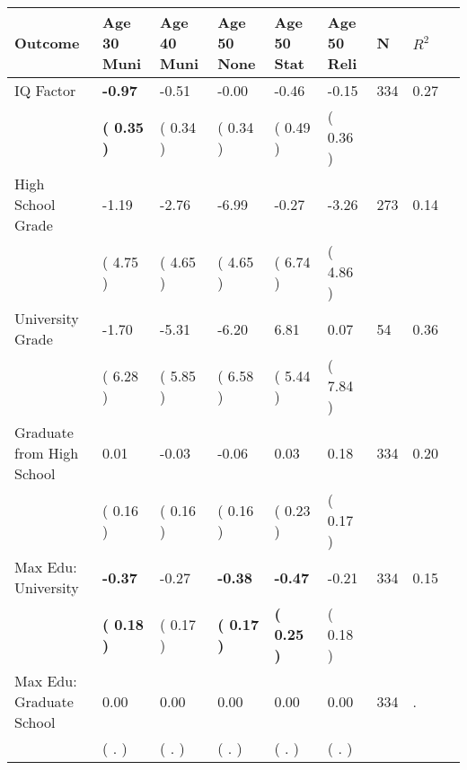 \begin{tabular}{L{6.2cm} C{1.8cm} C{1.8cm} C{1.8cm} C{1.8cm} C{1.8cm} C{1.8cm} C{0.3cm} C{0.3cm}}
\toprule
 \textbf{Outcome} & \textbf{Age 30 Muni} & \textbf{Age 40 Muni} & \textbf{Age 50 None} & \textbf{Age 50 Stat} & \textbf{Age 50 Reli} & \textbf{N} & \textbf{$ R^2$} \\
\midrule
IQ Factor & \textbf{    -0.97} &     -0.51 &     -0.00 &     -0.46 &     -0.15  & 334 &       0.27 \\ 
 & \textbf{(     0.35 )} & (     0.34 ) & (     0.34 ) & (     0.49 ) & (     0.36 )  & \\
High School Grade &     -1.19 &     -2.76 &     -6.99 &     -0.27 &     -3.26  & 273 &       0.14 \\ 
 & (     4.75 ) & (     4.65 ) & (     4.65 ) & (     6.74 ) & (     4.86 )  & \\
University Grade &     -1.70 &     -5.31 &     -6.20 &      6.81 &      0.07  & 54 &       0.36 \\ 
 & (     6.28 ) & (     5.85 ) & (     6.58 ) & (     5.44 ) & (     7.84 )  & \\
Graduate from High School &      0.01 &     -0.03 &     -0.06 &      0.03 &      0.18  & 334 &       0.20 \\ 
 & (     0.16 ) & (     0.16 ) & (     0.16 ) & (     0.23 ) & (     0.17 )  & \\
Max Edu: University & \textbf{    -0.37} &     -0.27 & \textbf{    -0.38} & \textbf{    -0.47} &     -0.21  & 334 &       0.15 \\ 
 & \textbf{(     0.18 )} & (     0.17 ) & \textbf{(     0.17 )} & \textbf{(     0.25 )} & (     0.18 )  & \\
Max Edu: Graduate School &      0.00 &      0.00 &      0.00 &      0.00 &      0.00  & 334 &          . \\ 
 & (        . ) & (        . ) & (        . ) & (        . ) & (        . )  & \\
\bottomrule
\end{tabular}
